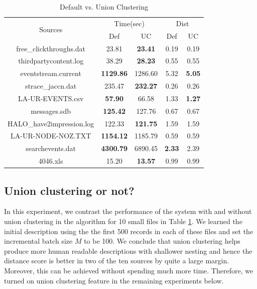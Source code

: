{\begin{table}[th]
\centering
\caption{Default vs. Union Clustering}
\label{tab:uceffects}
\begin{tabular}{|c||c|c||c|c|} \hline
\multirow{2}{*}{Sources} & \multicolumn{2}{c||}{Time(sec)} & \multicolumn{2}{c|}{Dist} \\ \cline{2-5}
 & Def & UC &  Def & UC \\ \hline 
free\_clickthroughs.dat & 23.81  & {\bf 23.41} & 0.19 & 0.19 \\ \hline
thirdpartycontent.log & 38.29 & {\bf 28.23} & 0.55 & 0.55 \\ \hline
eventstream.current & {\bf 1129.86} & 1286.60 & 5.32 & {\bf 5.05} \\ \hline
strace\_jaccn.dat & 235.47 & {\bf 232.27} & 0.26 & 0.26 \\ \hline
LA-UR-EVENTS.csv & {\bf 57.90} & 66.58 & 1.33 & {\bf 1.27} \\ \hline
messages.sdb & {\bf 125.42} & 127.76 & 0.67 & 0.67 \\ \hline
HALO\_have2impression.log & 122.33 & {\bf 121.75} & 1.59 & 1.59 \\ \hline
LA-UR-NODE-NOZ.TXT & {\bf 1154.12} & 1185.79 & 0.59 & 0.59 \\ \hline
searchevents.dat & {\bf 4300.79} & 6890.45 & {\bf 2.33} & 2.39 \\ \hline
4046.xls & 15.20 & {\bf 13.57} & 0.99 & 0.99  \\ \hline
\end{tabular}
\end{table}

\subsection{Union clustering or not?}
In this experiment, we contrast the performance of the system with and without
union clustering in the \learnpads{} algorithm for 10 small files in 
Table \ref{tab:uceffects}. We learned the initial description using the
the first 500 records in each of these files and set the
incremental batch size $M$ to be 100. We conclude that
union clustering helps produce more human readable descriptions with shallower
nesting and hence the distance score is better in two of the ten sources by
quite a large margin. Moreover, this can be achieved without spending much 
more time. Therefore, we turned on union clustering feature in the remaining
experiments below. 
}

